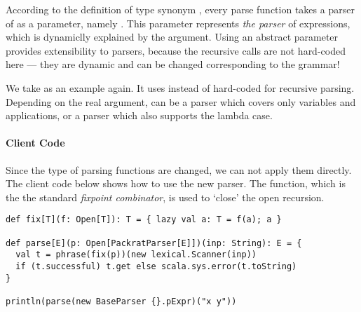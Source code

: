 According to the definition of type synonym , every parse function takes a parser of  as a parameter, namely . This parameter  represents \emph{the parser} of expressions, which is dynamiclly explained by the argument. Using an abstract parameter provides extensibility to parsers, because the recursive calls are not hard-coded here --- they are dynamic and can be changed corresponding to the grammar!

We take  as an example again. It uses  instead of hard-coded  for recursive parsing. Depending on the real argument,  can be a parser which covers only variables and applications, or a parser which also supports the lambda case.

\paragraph{Client Code} Since the type of parsing functions are changed, we can not apply them directly. The client code below shows how to use the new parser. The  function, which is the the standard \textit{fixpoint combinator}, is used to `close' the open recursion.

\begin{lstlisting}
def fix[T](f: Open[T]): T = { lazy val a: T = f(a); a }

def parse[E](p: Open[PackratParser[E]])(inp: String): E = {
  val t = phrase(fix(p))(new lexical.Scanner(inp))
  if (t.successful) t.get else scala.sys.error(t.toString)
}

println(parse(new BaseParser {}.pExpr)("x y"))
\end{lstlisting}



